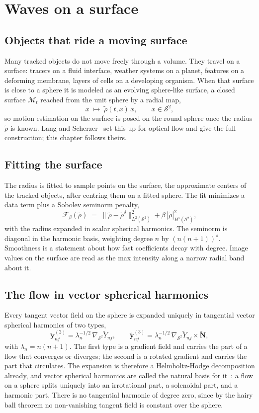 \chapter{Waves on a surface}

\section{Objects that ride a moving surface}

Many tracked objects do not move freely through a volume. They travel on a surface: tracers on a
fluid interface, weather systems on a planet, features on a deforming membrane, layers of cells on a
developing organism. When that surface is close to a sphere it is modeled as an evolving sphere-like
surface, a closed surface \(\mathcal{M}_t\) reached from the unit sphere by a radial map,
\[
x \;\mapsto\; \tilde\rho(t, x)\, x, \qquad x \in \mathcal{S}^2,
\]
so motion estimation on the surface is posed on the round sphere once the radius \(\tilde\rho\) is
known. Lang and Scherzer~\cite{src:Lang-and-Scherzer-2015} set this up for optical flow and give the full construction; this chapter
follows theirs.

\section{Fitting the surface}

The radius is fitted to sample points on the surface, the approximate centers of the tracked
objects, after centring them on a fitted sphere. The fit minimizes a data term plus a Sobolev
seminorm penalty,
\[
\mathcal{F}_\beta(\tilde\rho) \;=\; \|\tilde\rho - \tilde\rho^{\delta}\|^2_{L^2(\mathcal{S}^2)}
+ \beta\, |\tilde\rho|^2_{H^s(\mathcal{S}^2)},
\]
with the radius expanded in scalar spherical harmonics. The seminorm is diagonal in the harmonic
basis, weighting degree \(n\) by \((n(n+1))^s\). Smoothness is a statement about how fast coefficients
decay with degree. Image values on the surface are read as the max intensity along a narrow
radial band about it.

\section{The flow in vector spherical harmonics}

Every tangent vector field on the sphere is expanded uniquely in tangential vector spherical
harmonics of two types,
\[
\tilde{\mathbf{y}}^{(2)}_{nj} = \lambda_n^{-1/2}\, \nabla_{\mathcal{S}^2} \tilde Y_{nj}, \qquad
\tilde{\mathbf{y}}^{(3)}_{nj} = \lambda_n^{-1/2}\, \nabla_{\mathcal{S}^2} \tilde Y_{nj} \times \tilde{\mathbf{N}},
\]
with \(\lambda_n = n(n+1)\). The first type is a gradient field and carries the part of a flow that
converges or diverges; the second is a rotated gradient and carries the part that circulates. The
expansion is therefore a Helmholtz-Hodge decomposition already, and vector spherical
harmonics are called the natural basis for it~\cite{src:arXiv-1809-04555}: a flow on a sphere splits uniquely into an
irrotational part, a solenoidal part, and a harmonic part. There is no tangential harmonic of degree
zero, since by the hairy ball theorem no non-vanishing tangent field is constant over the sphere.


